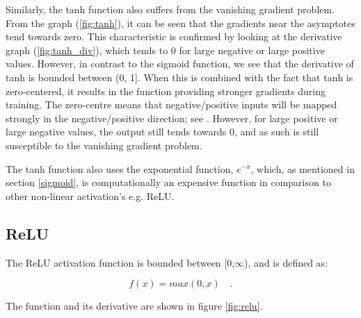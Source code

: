            Similarly, the tanh function also suffers from the vanishing gradient problem. From the graph (\ref{fig:tanh}), it can be seen that the gradients near the asymptotes tend towards zero. This characteristic is confirmed by looking at the derivative graph (\ref{fig:tanh_div}), which tends to 0 for large negative or large positive values. However, in contrast to the sigmoid function, we see that the derivative of tanh is bounded between (0, 1]. When this is combined with the fact that tanh is zero-centered, it results in the function providing stronger gradients during training. The zero-centre means that negative/positive inputs will be mapped strongly in the negative/positive direction; see \cite{activation_funcB}. However, for large positive or large negative values, the output still tends towards 0, and as such is still susceptible to the vanishing gradient problem. 
            
            The tanh function also uses the exponential function, $e^{-x}$, which, as mentioned in section \ref{sigmoid}, is computationally an expensive function in comparison to other non-linear activation's e.g. ReLU.
        
        \subsection{ReLU}
            The ReLU activation function is bounded between [0,$\infty$), and is defined as:
            
            \begin{equation}
                f(x) = max(0,x) \quad.
            \end{equation}
            
            The function and its derivative are shown in figure \ref{fig:relu}.  
            
